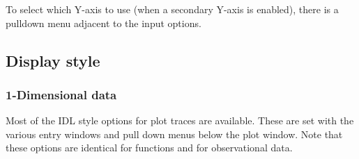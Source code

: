 \documentclass[11pt,twoside,english]{article}
\begin{document}
To select which Y-axis to use (when a secondary Y-axis is enabled),
there is a pulldown menu adjacent to the input options.

\subsection{Display style}


\subsubsection{1-Dimensional data}

Most of the IDL style options for plot traces are available. These are
set with the various entry windows and pull down menus below the plot
window. Note that these options are identical for functions and for
observational data.
\end{document}
